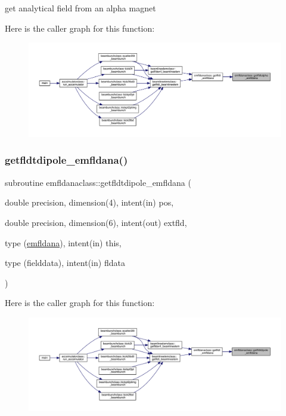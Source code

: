 get analytical field from an alpha magnet 

Here is the caller graph for this function\+:\nopagebreak
\begin{figure}[H]
\begin{center}
\leavevmode
\includegraphics[width=350pt]{namespaceemfldanaclass_a8e64e65ca00c486db83f7f7152aa5744_icgraph}
\end{center}
\end{figure}
\mbox{\label{namespaceemfldanaclass_aa9ea3d7a230bc88c83be56723c8d96a6}} 
\subsubsection{\texorpdfstring{getfldtdipole\_emfldana()}{getfldtdipole\_emfldana()}}
{\footnotesize\ttfamily subroutine emfldanaclass\+::getfldtdipole\+\_\+emfldana (\begin{DoxyParamCaption}\item[{double precision, dimension(4), intent(in)}]{pos,  }\item[{double precision, dimension(6), intent(out)}]{extfld,  }\item[{type (\mbox{\hyperlink{namespaceemfldanaclass_structemfldanaclass_1_1emfldana}{emfldana}}), intent(in)}]{this,  }\item[{type (fielddata), intent(in)}]{fldata }\end{DoxyParamCaption})}

Here is the caller graph for this function\+:\nopagebreak
\begin{figure}[H]
\begin{center}
\leavevmode
\includegraphics[width=350pt]{namespaceemfldanaclass_aa9ea3d7a230bc88c83be56723c8d96a6_icgraph}
\end{center}
\end{figure}
\mbox{\label{namespaceemfldanaclass_ac3c4c5ce44722c1aa2ba2d10700e0215}} 
